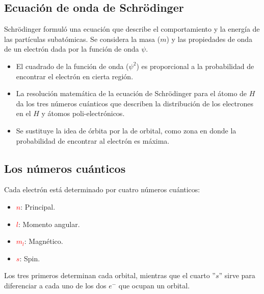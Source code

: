     \subsection{Ecuación de onda de Schrödinger}
       \indent Schrödinger formuló una ecuación que describe el comportamiento y la energía de las partículas subatómicas. Se considera la masa ($m$) y las propiedades de onda de un electrón dada por la función de onda $\psi$.
       \begin{itemize} 
            \item El cuadrado de la función de onda ($\psi^2$) es proporcional a la probabilidad de encontrar el electrón en cierta región.
            \item La resolución matemática de la ecuación de Schrödinger para el átomo de $H$ da los tres números cuánticos que describen la distribución de los electrones en el $H$ y átomos poli-electrónicos. 
            \item Se sustituye la idea de órbita por la de orbital, como zona en donde la probabilidad de encontrar al electrón es máxima.
       \end{itemize}

    \subsection{Los números cuánticos}
        \indent Cada electrón está determinado por cuatro números cuánticos:
            \begin{itemize}
                \item \textcolor{red}{$n$}: Principal.
                \item \textcolor{red}{$l$}: Momento angular.
                \item \textcolor{red}{$m_l$}: Magnético.
                \item \textcolor{red}{$s$}: Spin.
            \end{itemize} \hfill
            
            \indent Los tres primeros determinan cada orbital, mientras que el cuarto ''$s$'' sirve para diferenciar a cada uno de los dos $e^-$ que ocupan un orbital.

